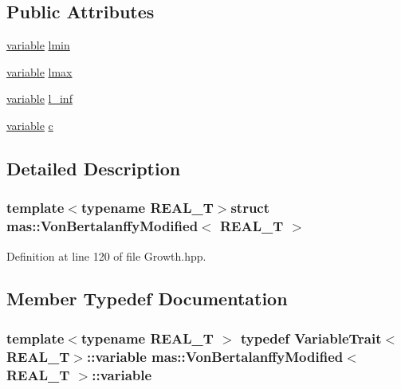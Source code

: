 \subsection*{Public Attributes}
\begin{DoxyCompactItemize}
\item 
\hyperlink{structmas_1_1_von_bertalanffy_modified_af5a89449b12de884a01c34464ba2bae0}{variable} \hyperlink{structmas_1_1_von_bertalanffy_modified_a2845686ae982422d40b571cb19712cc9}{lmin}
\item 
\hyperlink{structmas_1_1_von_bertalanffy_modified_af5a89449b12de884a01c34464ba2bae0}{variable} \hyperlink{structmas_1_1_von_bertalanffy_modified_a841b52d7c02054bb25516558f192a092}{lmax}
\item 
\hyperlink{structmas_1_1_von_bertalanffy_modified_af5a89449b12de884a01c34464ba2bae0}{variable} \hyperlink{structmas_1_1_von_bertalanffy_modified_a474caebe2c9277303d7bdba03101432c}{l\-\_\-inf}
\item 
\hyperlink{structmas_1_1_von_bertalanffy_modified_af5a89449b12de884a01c34464ba2bae0}{variable} \hyperlink{structmas_1_1_von_bertalanffy_modified_ac1ceb4a5dc583de01c35054eb5034f1d}{c}
\end{DoxyCompactItemize}


\subsection{Detailed Description}
\subsubsection*{template$<$typename R\-E\-A\-L\-\_\-\-T$>$struct mas\-::\-Von\-Bertalanffy\-Modified$<$ R\-E\-A\-L\-\_\-\-T $>$}



Definition at line 120 of file Growth.\-hpp.



\subsection{Member Typedef Documentation}
\hypertarget{structmas_1_1_von_bertalanffy_modified_af5a89449b12de884a01c34464ba2bae0}{
\subsubsection[{variable}]{\setlength{\rightskip}{0pt plus 5cm}template$<$typename R\-E\-A\-L\-\_\-\-T $>$ typedef {\bf Variable\-Trait}$<$R\-E\-A\-L\-\_\-\-T$>$\-::{\bf variable} {\bf mas\-::\-Von\-Bertalanffy\-Modified}$<$ R\-E\-A\-L\-\_\-\-T $>$\-::{\bf variable}}}\label{structmas_1_1_von_bertalanffy_modified_af5a89449b12de884a01c34464ba2bae0}


